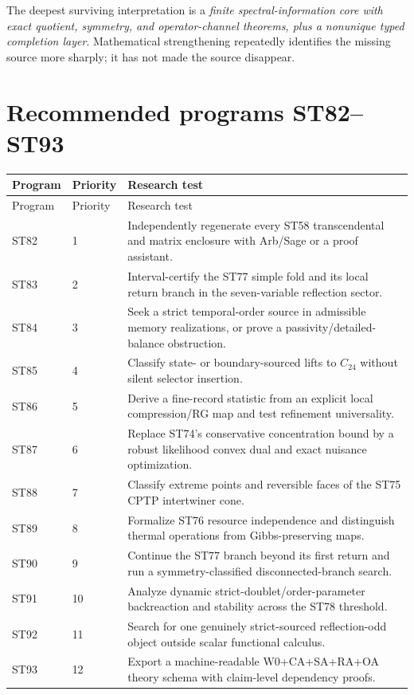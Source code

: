 \documentclass[11pt,a4paper]{article}
\begin{document}
The deepest surviving interpretation is a \emph{finite spectral-information core with exact quotient, symmetry, and operator-channel theorems, plus a nonunique typed completion layer}. Mathematical strengthening repeatedly identifies the missing source more sharply; it has not made the source disappear.

\section{Recommended programs ST82--ST93}

\small
\begin{longtable}{@{}p{}p{}p{}@{}}
\toprule
Program & Priority & Research test\\
\midrule
\endfirsthead
\toprule
Program & Priority & Research test\\
\midrule
\endhead
ST82 & 1 & Independently regenerate every ST58 transcendental and matrix enclosure with Arb/Sage or a proof assistant.\\
ST83 & 2 & Interval-certify the ST77 simple fold and its local return branch in the seven-variable reflection sector.\\
ST84 & 3 & Seek a strict temporal-order source in admissible memory realizations, or prove a passivity/detailed-balance obstruction.\\
ST85 & 4 & Classify state- or boundary-sourced lifts to $C_{24}$ without silent selector insertion.\\
ST86 & 5 & Derive a fine-record statistic from an explicit local compression/RG map and test refinement universality.\\
ST87 & 6 & Replace ST74's conservative concentration bound by a robust likelihood convex dual and exact nuisance optimization.\\
ST88 & 7 & Classify extreme points and reversible faces of the ST75 CPTP intertwiner cone.\\
ST89 & 8 & Formalize ST76 resource independence and distinguish thermal operations from Gibbs-preserving maps.\\
ST90 & 9 & Continue the ST77 branch beyond its first return and run a symmetry-classified disconnected-branch search.\\
ST91 & 10 & Analyze dynamic strict-doublet/order-parameter backreaction and stability across the ST78 threshold.\\
ST92 & 11 & Search for one genuinely strict-sourced reflection-odd object outside scalar functional calculus.\\
ST93 & 12 & Export a machine-readable W0+CA+SA+RA+OA theory schema with claim-level dependency proofs.\\
\bottomrule
\end{longtable}
\normalsize
\end{document}
